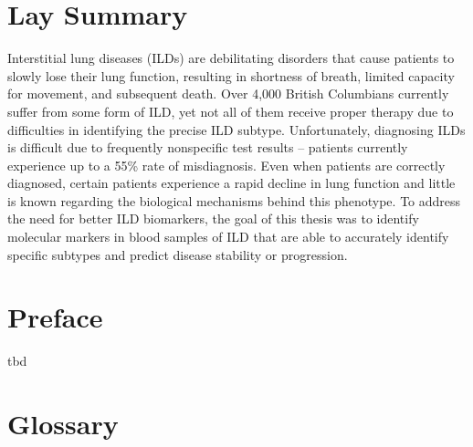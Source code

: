 \documentclass[
]{article}
\begin{document}
\clearpage

\section*{Lay Summary}

Interstitial lung diseases (ILDs) are debilitating disorders that cause patients to slowly lose their lung function, resulting in shortness of breath, limited capacity for movement, and subsequent death. Over 4,000 British Columbians currently suffer from some form of ILD, yet not all of them receive proper therapy due to difficulties in identifying the precise ILD subtype. Unfortunately, diagnosing ILDs is difficult due to frequently nonspecific test results -- patients currently experience up to a 55\% rate of misdiagnosis. Even when patients are correctly diagnosed, certain patients experience a rapid decline in lung function and little is known regarding the biological mechanisms behind this phenotype. To address the need for better ILD biomarkers, the goal of this thesis was to identify molecular markers in blood samples of ILD that are able to accurately identify specific subtypes and predict disease stability or progression.

\clearpage

\section*{Preface}

tbd

\clearpage


\renewcommand*\contentsname{Table of Contents}
\thispagestyle{empty}
\begin{singlespace}
\renewcommand{\cftsecleader}{\cftdotfill{\cftdotsep}}
\setcounter{tocdepth}{3}
\tableofcontents
\clearpage
{}
{}
\setlength\cftfignumwidth{3em}
\setlength\cfttabnumwidth{3em}
\listoftables
\clearpage
{}
{}
\listoffigures
\clearpage
\end{singlespace}

\section*{Glossary}
\end{document}
